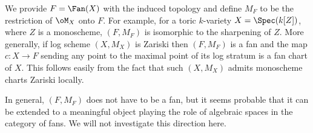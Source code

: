 \documentclass[10pt]{../fichiers-configuration-latex/smfart}
\begin{document}
We provide $F=\Fan(X)$ with the induced topology and define $M_F$ to be the
restriction of $\oM_X$ onto $F$. For example, for a toric $k$-variety
$X=\Spec(k[Z])$, where $Z$ is a monoscheme, $(F,M_F)$ is isomorphic
to the sharpening of $Z$. More generally, if log scheme $(X,M_X)$
is Zariski then $(F,M_F)$ is a fan and the map $c{\colon}X\to F$ sending any
point to the maximal point of its log stratum is a fan chart of $X$.
This follows easily from the fact that such $(X,M_X)$ admits monoscheme
charts Zariski locally.

\begin{remark2}
In general, $(F,M_F)$ does not have to be a fan, but it seems probable that
it can be extended to a meaningful object playing the role of algebraic
spaces in the category of fans. We will not investigate this direction here.
\end{remark2}
\end{document}
